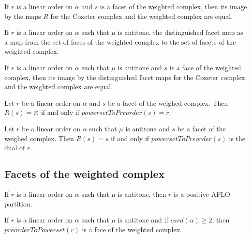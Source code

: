 \begin{sublemma}[R\_comparison]
If $r$ is a linear order on $\alpha$ and $s$ is a facet of the weighted complex, then its image by the maps $R$ for the Coxeter complex and
the weighted complex are equal.

\end{sublemma}


\begin{subdefi}[DF\_weighted]
If $r$ is a linear order on $\alpha$ such that $\mu$ is antitone,
the distinguished facet map as a map from the set of faces of the weighted complex to the set of facets of the weighted complex.

\end{subdefi}


\begin{sublemma}[DF\_comparison]
If $r$ is a linear order on $\alpha$ such that $\mu$ is antitone and $s$ is a face of the weighted complex, then its image by the distinguished
facet maps for the Coxeter complex and the weighted complex are equal.

\end{sublemma}

\begin{sublemma}
Let $r$ be a linear order on $\alpha$ and $s$ be a facet of the weighed complex. Then $R(s)=\varnothing$ if and only if $powersetToPreorder(s)=r$.

\end{sublemma}

\begin{sublemma}
Let $r$ be a linear order on $\alpha$ such that $\mu$ is antitone and $s$ be a facet of the weighed complex. Then $R(s)=s$ if and only if $powersetToPreorder(s)$ is 
the dual of $r$.

\end{sublemma}


\subsection{Facets of the weighted complex}

\begin{sublemma}
If $r$ is a linear order on $\alpha$ such that $\mu$ is antitone, then $r$ is a positive AFLO partition.

\end{sublemma}

\begin{sublemma}
If $r$ is a linear order on $\alpha$ such that $\mu$ is antitone and if $card(\alpha)\geq 2$, then $preorderToPowerset(r)$ is a face of the weighted complex.

\end{sublemma}

